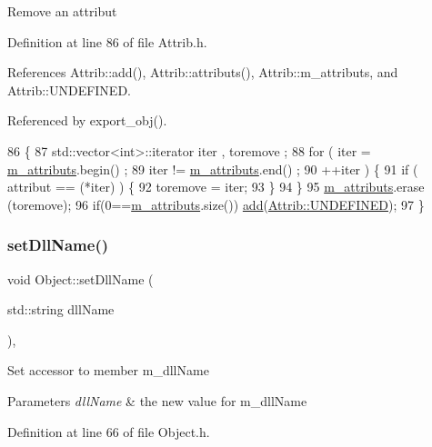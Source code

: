 Remove an attribut 

Definition at line 86 of file Attrib.\+h.



References Attrib\+::add(), Attrib\+::attributs(), Attrib\+::m\+\_\+attributs, and Attrib\+::\+U\+N\+D\+E\+F\+I\+N\+ED.



Referenced by export\+\_\+obj().


\begin{DoxyCode}
86                                \{
87     std::vector<int>::iterator iter , toremove ;
88     \textcolor{keywordflow}{for} ( iter  = \hyperlink{classAttrib_ac4bd58a0cc6b38a3b711d609a3d3aacc}{m\_attributs}.begin() ;
89           iter != \hyperlink{classAttrib_ac4bd58a0cc6b38a3b711d609a3d3aacc}{m\_attributs}.end()   ;
90           ++iter ) \{
91       \textcolor{keywordflow}{if} ( attribut == (*iter) ) \{
92         toremove = iter;
93       \}
94     \}
95     \hyperlink{classAttrib_ac4bd58a0cc6b38a3b711d609a3d3aacc}{m\_attributs}.erase (toremove);
96     \textcolor{keywordflow}{if}(0==\hyperlink{classAttrib_ac4bd58a0cc6b38a3b711d609a3d3aacc}{m\_attributs}.size()) \hyperlink{classAttrib_a235f773af19c900264a190b00a3b4ad7}{add}(\hyperlink{classAttrib_a69e171d7cc6417835a5a306d3c764235a3a8da2ab97dda18aebab196fe4100531}{Attrib::UNDEFINED});
97   \}
\end{DoxyCode}
\mbox{\label{classObject_a870c5af919958c2136623b2d7816d123}} 
\subsubsection{\texorpdfstring{set\+Dll\+Name()}{setDllName()}}
{\footnotesize\ttfamily void Object\+::set\+Dll\+Name (\begin{DoxyParamCaption}\item[{std\+::string}]{dll\+Name }\end{DoxyParamCaption})\hspace{0.3cm}{\ttfamily [inline]}, {\ttfamily [inherited]}}

Set accessor to member m\+\_\+dll\+Name 
\begin{DoxyParams}{Parameters}
{\em dll\+Name} & the new value for m\+\_\+dll\+Name \\
\hline
\end{DoxyParams}


Definition at line 66 of file Object.\+h.



